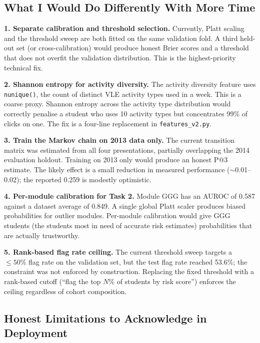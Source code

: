 \documentclass[10pt,a4paper]{article}
\begin{document}
\subsection{What I Would Do Differently With More Time}

\textbf{1. Separate calibration and threshold selection.}
Currently, Platt scaling and the threshold sweep are both fitted on the same validation
fold. A third held-out set (or cross-calibration) would produce honest Brier scores and
a threshold that does not overfit the validation distribution. This is the highest-priority
technical fix.

\textbf{2. Shannon entropy for activity diversity.}
The activity diversity feature uses \texttt{nunique()}, the count of distinct VLE activity
types used in a week. This is a coarse proxy. Shannon entropy across the activity type
distribution would correctly penalise a student who uses 10 activity types but concentrates
99\% of clicks on one. The fix is a four-line replacement in \texttt{features\_v2.py}.

\textbf{3. Train the Markov chain on 2013 data only.}
The current transition matrix was estimated from all four presentations, partially overlapping
the 2014 evaluation holdout. Training on 2013 only would produce an honest P@3 estimate.
The likely effect is a small reduction in measured performance ($\sim$0.01–0.02); the
reported 0.259 is modestly optimistic.

\textbf{4. Per-module calibration for Task 2.}
Module GGG has an AUROC of 0.587 against a dataset average of 0.849. A single global
Platt scaler produces biased probabilities for outlier modules. Per-module calibration
would give GGG students (the students most in need of accurate risk estimates) probabilities
that are actually trustworthy.

\textbf{5. Rank-based flag rate ceiling.}
The current threshold sweep targets a $\leq 50\%$ flag rate on the validation set, but the test flag rate reached 53.6\%; the constraint was not enforced by construction.
Replacing the fixed threshold with a rank-based cutoff (``flag the top $N\%$ of students
by risk score'') enforces the ceiling regardless of cohort composition.

\subsection{Honest Limitations to Acknowledge in Deployment}
\end{document}
